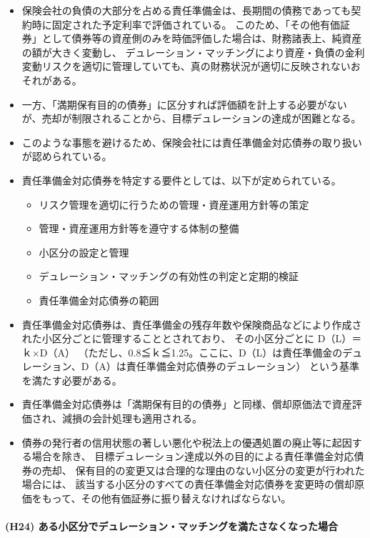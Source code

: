 \documentclass[report,gutter=10mm,fore-edge=10mm,uplatex,dvipdfmx]{jlreq}
\begin{document}
\begin{itemize}
\tightlist
\item
     保険会社の負債の大部分を占める責任準備金は、長期間の債務であっても契約時に固定された予定利率で評価されている。
     このため、「その他有価証券」として債券等の資産側のみを時価評価した場合は、財務諸表上、純資産の額が大きく変動し、
     デュレーション・マッチングにより資産・負債の金利変動リスクを適切に管理していても、真の財務状況が適切に反映されないおそれがある。
 \item
    一方、「満期保有目的の債券」に区分すれば評価額を計上する必要がないが、売却が制限されることから、目標デュレーションの達成が困難となる。
\item
  このような事態を避けるため、保険会社には責任準備金対応債券の取り扱いが認められている。
\item
  責任準備金対応債券を特定する要件としては、以下が定められている。

  \begin{itemize}
  \tightlist
  \item
    リスク管理を適切に行うための管理・資産運用方針等の策定
  \item
    管理・資産運用方針等を遵守する体制の整備
  \item
    小区分の設定と管理
  \item
    デュレーション・マッチングの有効性の判定と定期的検証
  \item
    責任準備金対応債券の範囲
  \end{itemize}
\item
  責任準備金対応債券は、責任準備金の残存年数や保険商品などにより作成された小区分ごとに管理することとされており、
    その小区分ごとに D（L）＝ｋ×D（A）
      （ただし、0.8≦ｋ≦1.25。ここに、D（L）は責任準備金のデュレーション、D（A）は責任準備金対応債券のデュレーション）
という基準を満たす必要がある。
\item
  責任準備金対応債券は「満期保有目的の債券」と同様、償却原価法で資産評価され、減損の会計処理も適用される。
\item
  債券の発行者の信用状態の著しい悪化や税法上の優遇処置の廃止等に起因する場合を除き、
    目標デュレーション達成以外の目的による責任準備金対応債券の売却、
    保有目的の変更又は合理的な理由のない小区分の変更が行われた場合には、
  該当する小区分のすべての責任準備金対応債券を変更時の償却原価をもって、その他有価証券に振り替えなければならない。
\end{itemize}

\paragraph{(H24) ある小区分でデュレーション・マッチングを満たさなくなった場合}
\end{document}
